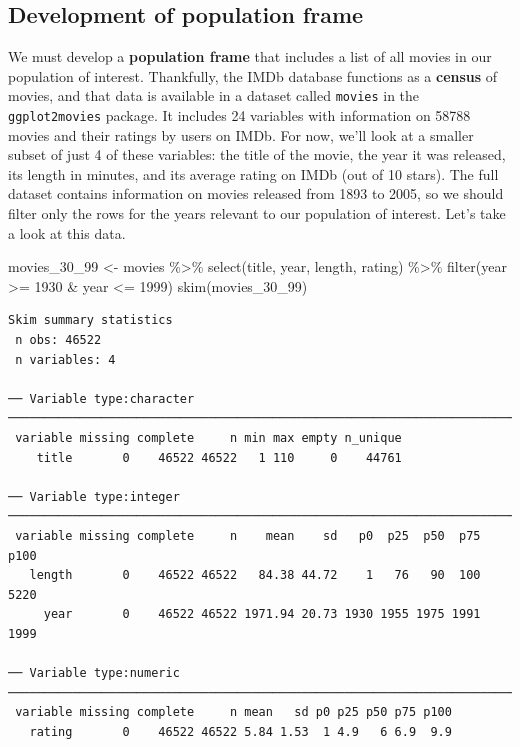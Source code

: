 \documentclass[
  letterpaper,
  DIV=11,
  numbers=noendperiod]{scrreprt}
\newenvironment{Shaded}{\begin{snugshade}}{\end{snugshade}}
\newcommand{\DecValTok}[1]{\textcolor[rgb]{0.68,0.00,0.00}{#1}}
\newcommand{\FunctionTok}[1]{\textcolor[rgb]{0.28,0.35,0.67}{#1}}
\newcommand{\NormalTok}[1]{\textcolor[rgb]{0.00,0.23,0.31}{#1}}
\newcommand{\OtherTok}[1]{\textcolor[rgb]{0.00,0.23,0.31}{#1}}
\newcommand{\SpecialCharTok}[1]{\textcolor[rgb]{0.37,0.37,0.37}{#1}}
\theoremstyle{definition}
\theoremstyle{remark}
\begin{document}
\hypertarget{development-of-population-frame}{%
\subsection{Development of population
frame}\label{development-of-population-frame}}

We must develop a \textbf{population frame} that includes a list of all
movies in our population of interest. Thankfully, the IMDb database
functions as a \textbf{census} of movies, and that data is available in
a dataset called \texttt{movies} in the \texttt{ggplot2movies} package.
It includes 24 variables with information on 58788 movies and their
ratings by users on IMDb. For now, we'll look at a smaller subset of
just 4 of these variables: the title of the movie, the year it was
released, its length in minutes, and its average rating on IMDb (out of
10 stars). The full dataset contains information on movies released from
1893 to 2005, so we should filter only the rows for the years relevant
to our population of interest. Let's take a look at this data.

\begin{Shaded}
\begin{Highlighting}[]
\NormalTok{movies\_30\_99 }\OtherTok{\textless{}{-}}\NormalTok{ movies }\SpecialCharTok{\%\textgreater{}\%} 
  \FunctionTok{select}\NormalTok{(title, year, length, rating) }\SpecialCharTok{\%\textgreater{}\%} 
  \FunctionTok{filter}\NormalTok{(year }\SpecialCharTok{\textgreater{}=} \DecValTok{1930} \SpecialCharTok{\&}\NormalTok{ year }\SpecialCharTok{\textless{}=} \DecValTok{1999}\NormalTok{)}
\FunctionTok{skim}\NormalTok{(movies\_30\_99)}
\end{Highlighting}
\end{Shaded}

\begin{verbatim}
Skim summary statistics
 n obs: 46522 
 n variables: 4 

── Variable type:character ────────────────────────────────────────────────────────────────────────────
 variable missing complete     n min max empty n_unique
    title       0    46522 46522   1 110     0    44761

── Variable type:integer ──────────────────────────────────────────────────────────────────────────────
 variable missing complete     n    mean    sd   p0  p25  p50  p75 p100
   length       0    46522 46522   84.38 44.72    1   76   90  100 5220
     year       0    46522 46522 1971.94 20.73 1930 1955 1975 1991 1999

── Variable type:numeric ──────────────────────────────────────────────────────────────────────────────
 variable missing complete     n mean   sd p0 p25 p50 p75 p100
   rating       0    46522 46522 5.84 1.53  1 4.9   6 6.9  9.9
\end{verbatim}
\end{document}
